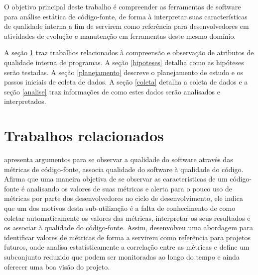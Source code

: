 
 \label{metodologia}

O objetivo principal deste trabalho é compreender as ferramentas de software
para análise estática de código-fonte, de forma à interpretar suas
características de qualidade interna a fim de servirem como referência para
desenvolvedores em atividades de evolução e manutenção em ferramentas deste
mesmo domínio.

A seção \ref{trabalhos-relacionados} traz trabalhos relacionados à compreensão
e observação de atributos de qualidade interna de programas. A seção
\ref{hipoteses} detalha como as hipóteses serão testadas. A seção
\ref{planejamento} descreve o planejamento de estudo e os passos iniciais de
coleta de dados. A seção \ref{coleta} detalha a coleta de dados e a seção
\ref{analise} traz informações de como estes dados serão analisados e
interpretados.

\section{Trabalhos relacionados} \label{trabalhos-relacionados}

 apresenta argumentos para se observar a qualidade
do software através das métricas de código-fonte, associa qualidade do
software à qualidade do código. Afirma que uma maneira objetiva de se observar
as características de um código-fonte é analisando os valores de suas métricas
e alerta para o pouco uso de métricas por parte dos desenvolvedores no ciclo
de desenvolvimento, ele indica que um dos motivos desta sub-utilização
é a falta de conhecimento de como coletar automaticamente
os valores das métricas, interpretar os seus resultados e os associar à
qualidade do código-fonte. Assim, desenvolveu uma abordagem para identificar
valores de métricas de forma a servirem como referência para projetos futuros,
onde analisa estatísticamente a correlação entre as métricas e define um
subconjunto reduzido que podem ser monitoradas ao longo do tempo e
ainda oferecer uma boa visão do projeto.

